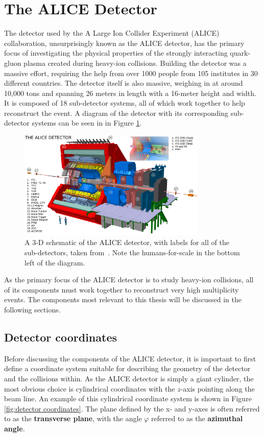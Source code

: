 \section{The ALICE Detector}
The detector used by the A Large Ion Collider Experiment (ALICE) collaboration, unsurprisingly known as the ALICE detector, has the primary focus of investigating the physical properties of the strongly interacting quark-gluon plasma created during heavy-ion collisions.
Building the detector was a massive effort, requiring the help from over 1000 people from 105 institutes in 30 different countries. 
The detector itself is also massive, weighing in at around 10,000 tons and spanning 26 meters in length with a 16-meter height and width.
It is composed of 18 sub-detector systems, all of which work together to help reconstruct the event.
A diagram of the detector with its corresponding sub-detector systems can be seen in in Figure \ref{fig:alice_detector}.
\begin{figure}
    \centering
    \includegraphics[width=0.8\textwidth]{figures/experiment/ALICE_detector_schematic.png}
    \caption{A 3-D schematic of the ALICE detector, with labels for all of the sub-detectors, taken from~\cite{ALICEDiagram}. Note the humans-for-scale in the bottom left of the diagram.}
    \label{fig:alice_detector}
\end{figure}
As the primary focus of the ALICE detector is to study heavy-ion collisions, all of its components must work together to reconstruct very high multiplicity events. The components most relevant to this thesis will be discussed in the following sections.

\subsection{Detector coordinates}
Before discussing the components of the ALICE detector, it is important to first define a coordinate system suitable for describing the geometry of the detector and the collisions within. As the ALICE detector is simply a giant cylinder, the most obvious choice is cylindrical coordinates with the $z$-axis pointing along the beam line. An example of this cylindrical coordinate system is shown in Figure \ref{fig:detector coordinates}. The plane defined by the x- and y-axes is often referred to as the \textbf{transverse plane}, with the angle $\varphi$ referred to as the \textbf{azimuthal angle}.

